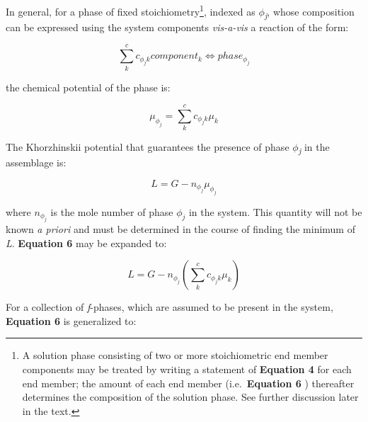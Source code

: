 \documentclass[11pt, titlepage, twoside]{article}
\begin{document}
In general, for a phase of fixed stoichiometry\footnote{A solution phase consisting of two or more stoichiometric end member components may be treated by writing a statement of \textbf{Equation 4} for each end member; the amount of each end member (i.e.\ \textbf{Equation 6} ) thereafter determines the composition of the solution phase. See further discussion later in the text.

}, indexed as $\phi$\emph{\textsubscript{j}}, whose composition can be expressed using the system components \emph{vis-a-vis} a reaction of the form:


\begin{MPEquation}[!ht]
\begin{equation}
\sum\limits_k^c {{c_{{\phi _j}k}}} componen{t_k} \Leftrightarrow phas{e_{{\phi _j}}}
\end{equation}
\label{MPEquationElement:3F3248E1-CD38-4AE7-99AA-243895E7C03D}
\end{MPEquation}
the chemical potential of the phase is:


\begin{MPEquation}[!ht]
\begin{equation}
{\mu _{{\phi _j}}} = \sum\limits_k^c {{c_{{\phi _j}k}}{\mu _k}}
\end{equation}
\label{MPEquationElement:46636B9E-E958-419D-9138-D31FDDFD6F5D}
\end{MPEquation}
The Khorzhinskii potential that guarantees the presence of phase $\phi$\emph{\textsubscript{j}} in the assemblage is:


\begin{MPEquation}[!ht]
\begin{equation}
L = G - {n_{{\phi _j}}}{\mu _{{\phi _j}}}
\end{equation}
\label{MPEquationElement:CCCD231B-39AA-4B0B-AFB6-24C093A64B6C}
\end{MPEquation}
where ${n_{{\phi _j}}}$ is the mole number of phase ${\phi _j}$ in the system. This quantity will not be known \emph{a priori} and must be determined in the course of finding the minimum of \emph{L}. \textbf{Equation 6} may be expanded to:


\begin{MPEquation}[!ht]
\begin{equation}
L = G - {n_{{\phi _j}}}\left( {\sum\limits_k^c {{c_{{\phi _j}k}}{\mu _k}} } \right)
\end{equation}
\label{MPEquationElement:48B7CE38-8B04-4077-C680-D7F4BEE71930}
\end{MPEquation}
For a collection of \emph{f}-phases, which are assumed to be present in the system, \textbf{Equation 6} is generalized to:
\end{document}
